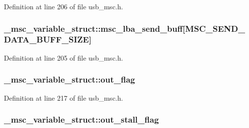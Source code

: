 Definition at line 206 of file usb\+\_\+msc.\+h.

\subsubsection[{\texorpdfstring{msc\+\_\+lba\+\_\+send\+\_\+buff}{msc_lba_send_buff}}]{ \+\_\+msc\+\_\+variable\+\_\+struct\+::msc\+\_\+lba\+\_\+send\+\_\+buff\mbox{[}{\bf M\+S\+C\+\_\+\+S\+E\+N\+D\+\_\+\+D\+A\+T\+A\+\_\+\+B\+U\+F\+F\+\_\+\+S\+I\+ZE}\mbox{]}}\hypertarget{struct__msc__variable__struct_a0e5aebfc79889e7d53d24a59a8eab69c}{}\label{struct__msc__variable__struct_a0e5aebfc79889e7d53d24a59a8eab69c}


Definition at line 205 of file usb\+\_\+msc.\+h.

\subsubsection[{\texorpdfstring{out\+\_\+flag}{out_flag}}]{ \+\_\+msc\+\_\+variable\+\_\+struct\+::out\+\_\+flag}\hypertarget{struct__msc__variable__struct_a01fa1cb9f93e868cfff642b9114a1839}{}\label{struct__msc__variable__struct_a01fa1cb9f93e868cfff642b9114a1839}


Definition at line 217 of file usb\+\_\+msc.\+h.

\subsubsection[{\texorpdfstring{out\+\_\+stall\+\_\+flag}{out_stall_flag}}]{ \+\_\+msc\+\_\+variable\+\_\+struct\+::out\+\_\+stall\+\_\+flag}\hypertarget{struct__msc__variable__struct_a746c7ecb22e6ca034a99188b4db4c99f}{}\label{struct__msc__variable__struct_a746c7ecb22e6ca034a99188b4db4c99f}


